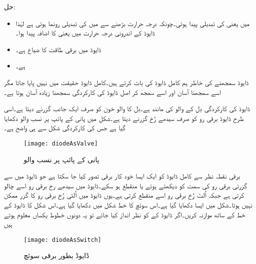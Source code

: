 حل:
\begin{itemize}
\item
  میں  یعنی  کی تبدیلی پیدا ہوئی۔چونکہ  درجہ حرارت بڑھنے سے  میں  کی تبدیلی رونما ہوتی ہے لہٰذا ڈایوڈ کے اندرونی درجہ حرارت میں  یعنی  کا اضافہ پیدا ہوا۔
\item
ڈایوڈ میں برقی طاقت کا ضیاع  ہے۔
\item
{}  ہے۔
\end{itemize}

	ڈایوڈ   سمجھنے کی خاطر ہم کامل ڈایوڈ  کی بات کرتے ہیں۔کامل ڈایوڈ  حقیقت میں نہیں پایا جاتا مگر اسے سمجھنا آسان اور اسے سمجھ کر اصل ڈایوڈ   کی کارکردگی سمجھنا زیادہ آسان ہوتا ہے۔

ڈایوڈ   کی کارکردگی دِل کے والو  کی مانند ہے۔دِل کا والو خون کو صرف ایک جانب گزرنے دیتا ہے۔اسی طرح ڈایوڈ   برقی رو کو صرف سیدھے رُخ گزرنے دیتا ہے۔شکل   میں پانی کے پائپ پر نسب والو دکھایا گیا ہے جس کی کارکردگی شکل سے ہی واضح ہے۔

\begin{figure}
\centering
\texttt{[image: diodeAsValve]}
\caption{پانی کے پائپ پر نسب والو}
\label{شکل_پانی_کا_والو}
\end{figure}

برقی نقطہ نظر سے کامل ڈایوڈ   کو ایک ایسا خود کار برقی  تصور کیا جا سکتا ہے جو ڈایوڈ میں سے گزرتی برقی رو کی سمت کو دیکھتے ہوئے   یا منقطع  ہو سکے۔ڈایوڈ   میں سیدھے رخ برقی رو اسے چالو کرتی ہے جبکہ اُلٹ رُخ برقی رو اسے منقطع کرتی ہے۔یوں  ڈایوڈ میں اُلٹی رُخ برقی رو کا گزر ممکن نہیں ہوتا۔شکل   میں ایسا دکھایا گیا ہے۔اس سوئچ کا خط شکل  میں دکھایا گیا ہے۔اس شکل کا ڈایوڈ کے خط کے ساتھ موازنہ کریں۔اگر  ڈایوڈ کے   کو نظر انداز کیا جائے تو یہ دونوں خطوط یکساں معلوم ہوتے ہیں

\begin{figure}
\centering
\texttt{[image: diodeAsSwitch]}
\caption{ڈایوڈ بطور برقی سوئچ}
\label{شکل_ڈایوڈ_بطور_برقی_سوئچ}
\end{figure}


